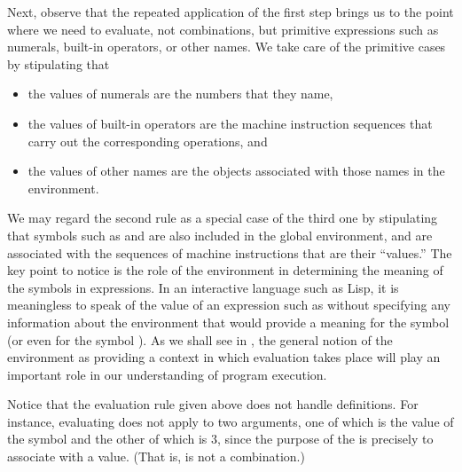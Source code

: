 Next, observe that the repeated application of the first step brings us to the point where we need to evaluate, not combinations, but primitive expressions such as numerals, built-in operators, or other names.
We take care of the primitive cases by stipulating that
\begin{itemize}

	\item
	the values of numerals are the numbers that they name,

	\item
	the values of built-in operators are the machine instruction sequences that
	carry out the corresponding operations, and

	\item
	the values of other names are the objects associated with those names in the
	environment.

\end{itemize}
We may regard the second rule as a special case of the third one by stipulating that symbols such as \code{+} and \code{*} are also included in the global environment, and are associated with the sequences of machine instructions that are their “values.”
The key point to notice is the role of the environment in determining the meaning of the symbols in expressions.
In an interactive language such as Lisp, it is meaningless to speak of the value of an expression such as  without specifying any information about the environment that would provide a meaning for the symbol  (or even for the symbol \code{+}).
As we shall see in , the general notion of the environment as providing a context in which evaluation takes place will play an important role in our understanding of program execution.

Notice that the evaluation rule given above does not handle definitions.
For instance, evaluating  does not apply  to two arguments, one of which is the value of the symbol  and the other of which is \( 3 \), since the purpose of the  is precisely to associate  with a value.
(That is,  is not a combination.)

